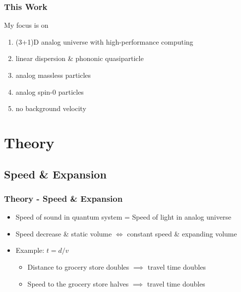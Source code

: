 \documentclass[aspectratio=169]{beamer}
\begin{document}
\begin{frame}
    \frametitle{This Work}

    My focus is on
        \begin{enumerate}
            \item (3+1)D analog universe with high-performance computing
            \item linear dispersion \& phononic quasiparticle
            \item analog massless particles
            \item analog spin-0 particles
            \item no background velocity
        \end{enumerate}

\end{frame}
\section{Theory}
\subsection{Speed \& Expansion}
\begin{frame}
    \frametitle{Theory - Speed \& Expansion}

    \begin{itemize}
        \item Speed of sound in quantum system = Speed of light in analog universe
        \item Speed decrease \& static volume $\iff$ constant speed \& expanding volume
        \item Example: $t = d/v$
        \begin{itemize}
            \item Distance to grocery store doubles $\implies$ travel time doubles
            \item Speed to the grocery store halves $\implies$ travel time doubles
        \end{itemize}
    \end{itemize}

\end{frame}
\end{document}
